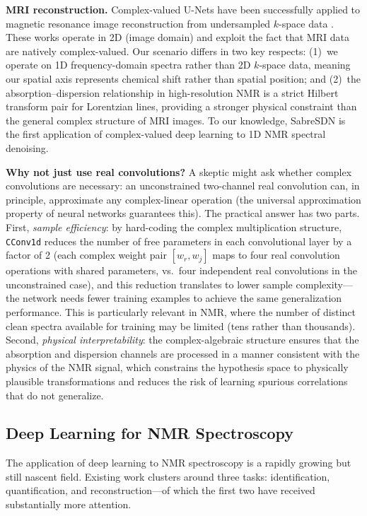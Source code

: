 \textbf{MRI reconstruction.}
Complex-valued U-Nets have been successfully applied to magnetic resonance
image reconstruction from undersampled $k$-space data
\cite{Virtue2017, Cole2021, Sriram2020}. These works operate in 2D (image
domain) and exploit the fact that MRI data are natively complex-valued.
Our scenario differs in two key respects: (1)~we operate on 1D frequency-domain
spectra rather than 2D $k$-space data, meaning our spatial axis represents
chemical shift rather than spatial position; and (2)~the absorption--dispersion
relationship in high-resolution NMR is a strict Hilbert transform pair for
Lorentzian lines, providing a stronger physical constraint than the general
complex structure of MRI images. To our knowledge, SabreSDN is the first
application of complex-valued deep learning to 1D NMR spectral denoising.

\textbf{Why not just use real convolutions?}
A skeptic might ask whether complex convolutions are necessary: an
unconstrained two-channel real convolution can, in principle, approximate
any complex-linear operation (the universal approximation property of neural
networks guarantees this). The practical answer has two parts. First,
\emph{sample efficiency}: by hard-coding the complex multiplication structure,
\texttt{CConv1d} reduces the number of free parameters in each convolutional
layer by a factor of 2 (each complex weight pair $[w_r, w_j]$ maps to four
real convolution operations with shared parameters, vs.\ four independent
real convolutions in the unconstrained case), and this reduction translates
to lower sample complexity---the network needs fewer training examples to
achieve the same generalization performance. This is particularly relevant
in NMR, where the number of distinct clean spectra available for training
may be limited (tens rather than thousands). Second, \emph{physical
interpretability}: the complex-algebraic structure ensures that the
absorption and dispersion channels are processed in a manner consistent
with the physics of the NMR signal, which constrains the hypothesis space
to physically plausible transformations and reduces the risk of learning
spurious correlations that do not generalize.

\subsection{Deep Learning for NMR Spectroscopy}
\label{sec:rw_nmr_dl}

The application of deep learning to NMR spectroscopy is a rapidly growing but
still nascent field. Existing work clusters around three tasks:
identification, quantification, and reconstruction---of which the first two
have received substantially more attention.


